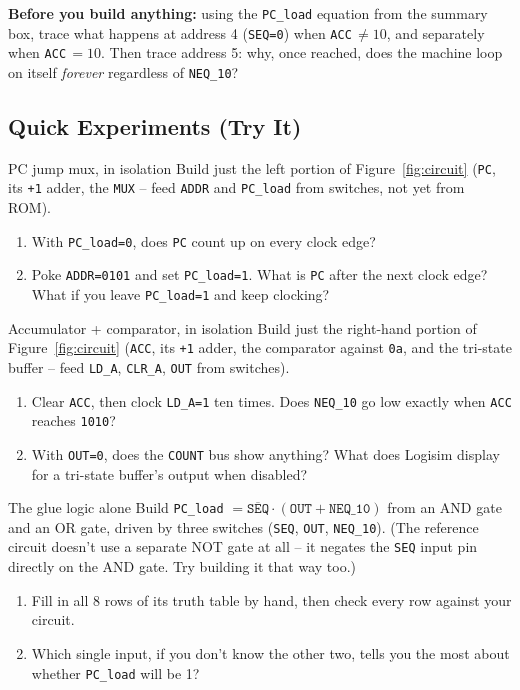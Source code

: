 \documentclass[11pt]{article}
\begin{document}
\noindent\textbf{Before you build anything:} using the \texttt{PC\_load} equation
from the summary box, trace what happens at address 4 (\texttt{SEQ=0}) when
\texttt{ACC}$\,\neq 10$, and separately when \texttt{ACC}$\,=10$. Then trace
address 5: why, once reached, does the machine loop on itself \emph{forever}
regardless of \texttt{NEQ\_10}?

\subsection*{Quick Experiments (Try It)}

\begin{tryit}{PC jump mux, in isolation}
Build just the left portion of Figure~\ref{fig:circuit} (\texttt{PC}, its
\texttt{+1} adder, the \texttt{MUX} -- feed
\texttt{ADDR} and \texttt{PC\_load} from switches, not yet from ROM).
\begin{enumerate}[nosep,leftmargin=*]
  \item With \texttt{PC\_load=0}, does \texttt{PC} count up on every clock edge?
  \item Poke \texttt{ADDR=0101} and set \texttt{PC\_load=1}. What is \texttt{PC}
        after the next clock edge? What if you leave \texttt{PC\_load=1} and keep
        clocking?
\end{enumerate}
\end{tryit}

\begin{tryit}{Accumulator + comparator, in isolation}
Build just the right-hand portion of Figure~\ref{fig:circuit} (\texttt{ACC}, its
\texttt{+1} adder, the comparator against \texttt{0a}, and the tri-state buffer --
feed \texttt{LD\_A}, \texttt{CLR\_A}, \texttt{OUT} from switches).
\begin{enumerate}[nosep,leftmargin=*]
  \item Clear \texttt{ACC}, then clock \texttt{LD\_A=1} ten times. Does
        \texttt{NEQ\_10} go low exactly when \texttt{ACC} reaches \texttt{1010}?
  \item With \texttt{OUT=0}, does the \texttt{COUNT} bus show anything? What does
        Logisim display for a tri-state buffer's output when disabled?
\end{enumerate}
\end{tryit}

\begin{tryit}{The glue logic alone}
Build \texttt{PC\_load} $= \overline{\texttt{SEQ}} \cdot (\texttt{OUT} +
\texttt{NEQ\_10})$ from an AND gate and an OR gate, driven by three switches
(\texttt{SEQ}, \texttt{OUT}, \texttt{NEQ\_10}). (The reference circuit doesn't use
a separate NOT gate at all -- it negates the \texttt{SEQ} input pin directly on
the AND gate. Try building it that way too.)
\begin{enumerate}[nosep,leftmargin=*]
  \item Fill in all 8 rows of its truth table by hand, then check every row against
        your circuit.
  \item Which single input, if you don't know the other two, tells you the most
        about whether \texttt{PC\_load} will be 1?
\end{enumerate}
\end{tryit}
\end{document}
